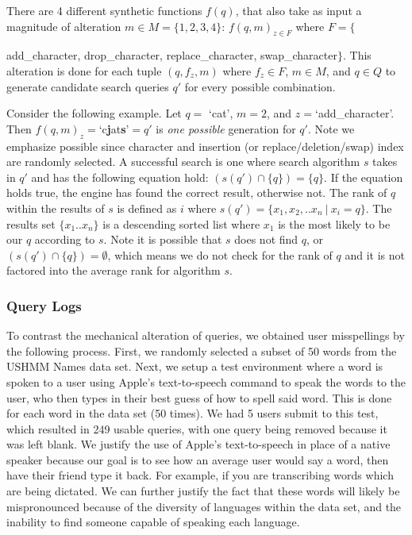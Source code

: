 \documentclass{article}
\begin{document}
There are 4 different synthetic functions $f(q)$, that also take as input a magnitude of alteration $m \in M = \{1, 2, 3, 4\}$: $f(q, m)_{z \in F}$ where $F = \{${add\_character, drop\_character, replace\_character, swap\_character$\}$.  This alteration is done for each tuple $(q,f_z,m)$ where $f_z \in F$, $m \in M$, and $q \in Q$ to generate candidate search queries $q'$ for every possible combination.  

Consider the following example.  Let $q =$ `cat', $m=2$, and $z=$`add\_character'.  Then $f(q,m)_z =$`c\textbf{j}at\textbf{s}'$= q'$ is \emph{one possible} generation for $q'$.  Note we emphasize possible since character and insertion (or replace/deletion/swap) index are randomly selected.  A successful search is one where search algorithm $s$ takes in $q'$ and has the following equation hold: $(s(q') \cap \{q\}) = \{q\}$.  If the equation holds true, the engine has found the correct result, otherwise not.  The rank of $q$ within the results of $s$ is defined as $i$ where $s(q') = \{x_1, x_2,..x_n\ |\ x_i = q\}$.  The results set $\{x_1..x_n\}$ is a descending sorted list where $x_1$ is the most likely to be our $q$ according to $s$.  Note it is possible that $s$ does not find $q$, or $(s(q') \cap \{q\}) = \emptyset$, which means we do not check for the rank of $q$ and it is not factored into the average rank for algorithm $s$.


\subsubsection{Query Logs} %
\label{ssub:query_logs}
To contrast the mechanical alteration of queries, we obtained user misspellings by the following process.  First, we randomly selected a subset of 50 words from the USHMM Names data set.  Next, we setup a test environment where a word is spoken to a user using Apple's text-to-speech command to speak the words to the user, who then types in their best guess of how to spell said word.  This is done for each word in the data set (50 times).  We had 5 users submit to this test, which resulted in 249 usable queries, with one query being removed because it was left blank.  We justify the use of Apple's text-to-speech in place of a native speaker because our goal is to see how an average user would say a word, then have their friend type it back.  For example, if you are transcribing words which are being dictated.  We can further justify the fact that these words will likely be mispronounced because of the diversity of languages within the data set, and the inability to find someone capable of speaking each language.

}
\end{document}
